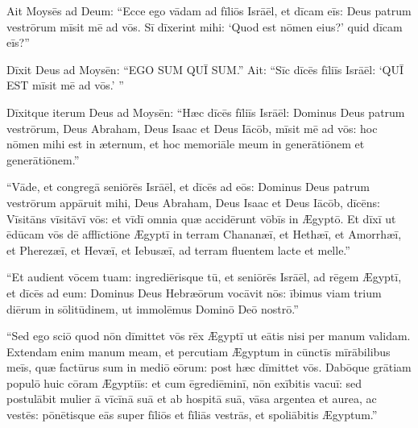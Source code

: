 Ait Moysēs ad Deum: ``Ecce ego vādam ad fīliōs Isrāēl,
et dīcam eīs: Deus patrum vestrōrum mīsit mē ad vōs.
Sī dīxerint mihi: `Quod est nōmen eius?' quid dīcam eīs?''

Dīxit Deus ad Moysēn: ``EGO SUM QUĪ SUM.'' Ait: ``Sīc dīcēs fīliīs Isrāēl: `QUĪ EST mīsit mē ad vōs.' ''

Dīxitque iterum Deus ad Moysēn: ``Hæc dīcēs fīliīs Isrāēl:
Dominus Deus patrum vestrōrum, Deus Abraham, Deus Isaac et Deus Iācōb,
 mīsit mē ad vōs: hoc nōmen mihi est in æternum,
et hoc memoriāle meum in generātiōnem et generātiōnem.''

``Vāde, et congregā seniōrēs Isrāēl,
et dīcēs ad eōs: Dominus Deus patrum vestrōrum appāruit mihi,
Deus Abraham, Deus Isaac et Deus Iācōb,
dīcēns: Vīsitāns vīsitāvī vōs: et vīdī omnia quæ accidērunt vōbīs in Ægyptō.
Et dīxī ut ēdūcam vōs dē afflīctiōne Ægyptī in terram Chananæī,
et Hethæī, et Amorrhæī, et Pherezæī, et Hevæī, et Iebusæī,
ad terram fluentem lacte et melle.''

``Et audient vōcem tuam: ingrediērisque tū,
et seniōrēs Isrāēl, ad rēgem Ægyptī, et dīcēs ad eum:
Dominus Deus Hebræōrum vocāvit nōs:
ībimus viam trium diērum in sōlitūdinem,
ut immolēmus Dominō Deō nostrō.''

``Sed ego sciō quod nōn dīmittet vōs rēx Ægyptī
ut eātis nisi per manum validam.
Extendam enim manum meam, et percutiam Ægyptum
in cūnctīs mīrābilibus meīs, 
quæ factūrus sum in mediō eōrum:
post hæc dīmittet vōs.
Dabōque grātiam populō huic cōram Ægyptiīs:
et cum ēgrediēminī, nōn exībitis vacuī:
sed postulābit mulier ā vīcīnā suā
et ab hospitā suā, vāsa argentea et aurea, ac vestēs:
pōnētisque eās super fīliōs et fīliās vestrās, et spoliābitis Ægyptum.''
